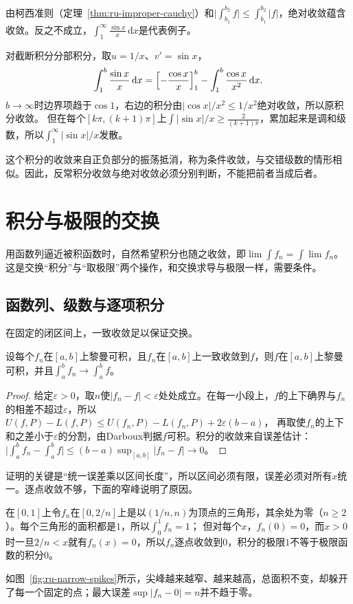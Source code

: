 由柯西准则（定理~\ref{thm:ru-improper-cauchy}）和$\bigl|\int_{b_1}^{b_2}f\bigr|\leq\int_{b_1}^{b_2}|f|$，绝对收敛蕴含收敛。反之不成立，$\int_1^\infty\frac{\sin x}x\,\mathrm dx$是代表例子。

\begin{example}
\label{ex:ru-sinc-conditional-convergence}
对截断积分分部积分，取$u=1/x$、$v'=\sin x$，
\[
 \int_1^b\frac{\sin x}x\,\mathrm dx=\Bigl[-\frac{\cos x}x\Bigr]_1^b-\int_1^b\frac{\cos x}{x^2}\,\mathrm dx.
\]
$b\to\infty$时边界项趋于$\cos1$，右边的积分由$|\cos x|/x^2\leq1/x^2$绝对收敛，所以原积分收敛。
但在每个$[k\pi,(k+1)\pi]$上$\int|\sin x|/x\geq\frac2{(k+1)\pi}$，累加起来是调和级数，所以$\int_1^\infty|\sin x|/x$发散。
\end{example}

这个积分的收敛来自正负部分的振荡抵消，称为条件收敛，与交错级数的情形相似。因此，反常积分收敛与绝对收敛必须分别判断，不能把前者当成后者。
\section{积分与极限的交换}
\label{sec:ru-limit-interchange}

用函数列逼近被积函数时，自然希望积分也随之收敛，即$\lim\int f_n=\int\lim f_n$。这是交换“积分”与“取极限”两个操作，和交换求导与极限一样，需要条件。

\subsection{函数列、级数与逐项积分}
\label{sec:ru-termwise-integration}

在固定的闭区间上，一致收敛足以保证交换。
\begin{theorem}[一致收敛与积分]
\label{thm:ru-uniform-limit-integral}
设每个$f_n$在$[a,b]$上黎曼可积，且$f_n$在$[a,b]$上一致收敛到$f$，则$f$在$[a,b]$上黎曼可积，并且$\int_a^bf_n\to\int_a^bf$。
\end{theorem}
\begin{proof}
给定$\varepsilon>0$，取$n$使$|f_n-f|<\varepsilon$处处成立。在每一小段上，$f$的上下确界与$f_n$的相差不超过$\varepsilon$，所以$U(f,P)-L(f,P)\leq U(f_n,P)-L(f_n,P)+2\varepsilon(b-a)$，
再取使$f_n$的上下和之差小于$\varepsilon$的分割，由Darboux判据$f$可积。积分的收敛来自误差估计：$\bigl|\int_a^bf_n-\int_a^bf\bigr|\leq(b-a)\sup_{[a,b]}|f_n-f|\to0$。
\end{proof}
证明的关键是“统一误差乘以区间长度”，所以区间必须有限，误差必须对所有$x$统一。逐点收敛不够，下面的窄峰说明了原因。
\begin{example}[逐点收敛而积分不收敛的窄峰函数列]
\label{ex:ru-narrow-spikes}
在$[0,1]$上令$f_n$在$[0,2/n]$上是以$(1/n,n)$为顶点的三角形，其余处为零（$n\geq2$）。每个三角形的面积都是$1$，所以$\int_0^1f_n=1$；
但对每个$x$，$f_n(0)=0$，而$x>0$时一旦$2/n<x$就有$f_n(x)=0$，所以$f_n$逐点收敛到$0$，积分的极限$1$不等于极限函数的积分$0$。
\end{example}
如图~\ref{fig:ru-narrow-spikes}所示，尖峰越来越窄、越来越高，总面积不变，却躲开了每一个固定的点；最大误差$\sup|f_n-0|=n$并不趋于零。

